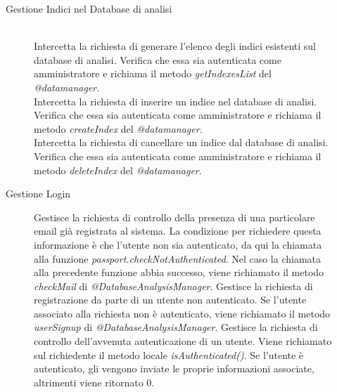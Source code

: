 \begin{description}
\begin{description}
\begin{mldescription}
 \end{mldescription}  
 \item[Gestione Indici nel Database di analisi]
  \begin{mldescription}
     \hfill \\
    Intercetta la richiesta di generare l'elenco degli indici esistenti sul database di analisi. Verifica che essa sia autenticata come amministratore e richiama il metodo \textit{getIndexesList} del \textit{@datamanager}.
     \hfill \\
    Intercetta la richiesta di inserire un indice nel database di analisi. Verifica che essa sia autenticata come amministratore e richiama il metodo \textit{createIndex} del \textit{@datamanager}.
     \hfill \\
     Intercetta la richiesta di cancellare un indice dal database di analisi. Verifica che essa sia autenticata come amministratore e richiama il metodo \textit{deleteIndex} del \textit{@datamanager}.
 \end{mldescription} 
 \item[Gestione Login]
 \begin{mldescription}
 Gestisce la richiesta di controllo della presenza di una particolare email già registrata al sistema. La condizione per richiedere questa informazione è che l'utente non sia autenticato, da qui la chiamata alla funzione \textit{passport.checkNotAuthenticated}. Nel caso la chiamata alla precedente funzione abbia successo, viene richiamato il metodo \textit{checkMail} di \textit{@DatabaseAnalysisManager}.
 Gestisce la richiesta di registrazione da parte di un utente non autenticato. Se l'utente associato alla richiesta non è autenticato, viene richiamato il metodo \textit{userSignup} di \textit{@DatabaseAnalysisManager}.
 Gestisce la richiesta di controllo dell'avvenuta autenticazione di un utente. Viene richiamato sul richiedente il metodo locale \textit{isAuthenticated()}. Se l'utente è autenticato, gli vengono inviate le proprie informazioni associate, altrimenti viene ritornato 0.

\end{mldescription}
\end{description}
\end{description}
